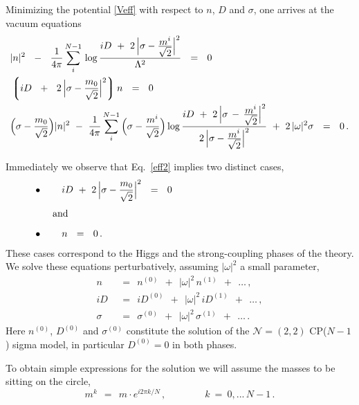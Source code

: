 \documentclass[12pt]{article}
\newcommand{\ntwot}{${\mathcal N}= \left(2,2\right) $ }
\newcommand{\lgr}{\left\lgroup}
\newcommand{\rgr}{\right\rgroup}
\newcommand{\nz}{{n^{(0)}}}
\newcommand{\no}{{n^{(1)}}}
\newcommand{\Dz}{{D^{(0)}}}
\newcommand{\Do}{{D^{(1)}}}
\newcommand{\sigz}{{\sigma^{(0)}}}
\newcommand{\sigo}{{\sigma^{(1)}}}
\begin{document}
	Minimizing the potential \eqref{Veff} with respect to $n$, $D$ and $ \sigma $, one arrives at
	the vacuum equations
\begin{align}
%
\label{eff1}
	&
	|n|^2  ~~-~~  \frac{1}{4\pi} \sum_i^{N-1}\, 
		{\rm log}\, 
		\frac{i D ~+~ 2\, \Bigl| \sigma -  \frac{\displaystyle m^i}{\displaystyle \sqrt{2}} \Bigr|^2}
							{\Lambda^2}   ~~=~~ 0 \\				
%
\label{eff2}
	&
	\lgr i D ~~+~~ 2\,\Bigl|\sigma - \frac{m_0}{\sqrt{2}}\Bigr|^2 \rgr n ~~=~~ 0 \\
%
\label{eff3}
&
	\Bigl(\sigma - \frac{m_0}{\sqrt{2}}\Bigr)|n|^2 
		~-~ 
	\frac{1}{4\pi} \sum_i^{N-1}\,
			\Bigl(\sigma - \frac{m^i}{\sqrt{2}}\Bigr)\,
		{\rm log}\, 
		\frac{i D ~+~ 2\, \Bigl| \sigma \,-\, \frac{\displaystyle m^i}{\displaystyle \sqrt{2}} \Bigr|^2}
		{2\, \Bigl| \sigma - \frac{\displaystyle m^i}{\displaystyle \sqrt{2}} \Bigr|^2}
		~+~ 2\, |\omega|^2\sigma ~~=~~ 0\,.
\end{align}

	Immediately we observe that Eq.~\eqref{eff2} implies two distinct cases,
\begin{align}
%
\label{higgsph}
& \bullet \qquad
	 iD ~+~ 2\,\Bigl|\sigma - \frac{\displaystyle m_0}{\displaystyle \sqrt{2}}\Bigr|^2 ~~=~~ 0  
	\qquad\qquad\qquad\qquad\qquad\qquad\qquad\qquad
\\[1mm]
%
\notag
& \qquad \text{and} \\[2mm]
%
\label{strongph}
& \bullet \qquad
	 n ~~=~~ 0 \,. 
\end{align}
	These cases correspond to the Higgs and the strong-coupling phases of the theory. 
	We solve these equations perturbatively, assuming $ |\omega|^2 $ a small parameter,
\begin{align*}
%
	n & ~~=~~ \nz  ~~+~~ |\omega|^2\,\no ~~+~~ \ldots\,, \\[2mm]
%
	iD & ~~=~~ i\Dz  ~~+~~ |\omega|^2\,i\Do ~~+~~ \ldots\,, \\[2.3mm]
%
	\sigma & ~~=~~ \sigz ~~+~~ |\omega|^2\,\sigo ~~+~~ \ldots\,.
\end{align*}
	Here $ \nz $, $ \Dz $ and $\sigz$ constitute the solution of the \ntwot CP($N-1$) sigma model,
	in particular $ \Dz = 0 $ in both phases.

	To obtain simple expressions for the solution we will assume the masses to be sitting
	on the circle,
\[
	m^k ~~=~~ m \cdot e^{i 2\pi k / N }\,, \qquad\qquad k ~=~ 0,...\, N-1\,.
\]

%
%
\end{document}

